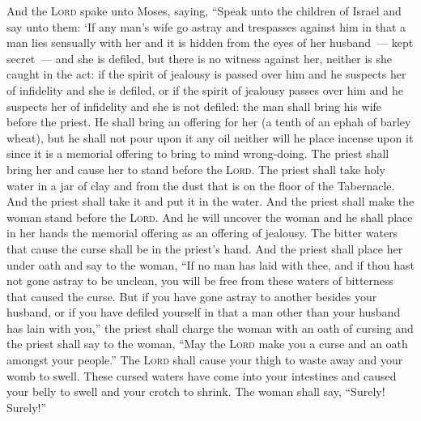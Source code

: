 \begin{inparaenum}
     And the \textsc{Lord} spake unto Moses, saying,%
     ``Speak unto the children of Israel and say unto them: `If any man's wife go astray and trespasses against him%
     in that a man lies sensually with her and it is hidden from the eyes of her husband~--- kept secret~--- and she is defiled, but there is no witness against her, neither is she caught in the act:%
     if the spirit of jealousy is passed over him and he suspects her of infidelity and she is defiled, or if the spirit of jealousy passes over him and he suspects her of infidelity and she is not defiled:%
     the man shall bring his wife before the priest. He shall bring an offering for her (a tenth of an ephah of barley wheat), but he shall not pour upon it any oil neither will he place incense upon it since it is a memorial offering to bring to mind wrong-doing.%
     The priest shall bring her and cause her to stand before the \textsc{Lord}.%
     The priest shall take holy water in a jar of clay and from the dust that is on the floor of the Tabernacle. And the priest shall take it and put it in the water.%
     And the priest shall make the woman stand before the \textsc{Lord}. And he will uncover the woman and he shall place in her hands the memorial offering as an offering of jealousy. The bitter waters that cause the curse shall be in the priest's hand.%
     And the priest shall place her under oath and say to the woman, ``If no man has laid with thee, and if thou hast not gone astray to be unclean, you will be free from these waters of bitterness that caused the curse.%
     But if you have gone astray to another besides your husband, or if you have defiled yourself in that a man other than your husband has lain with you,''%
     the priest shall charge the woman with an oath of cursing and the priest shall say to the woman, ``May the \textsc{Lord} make you a curse and an oath amongst your people.'' The \textsc{Lord} shall cause your thigh to waste away and your womb to swell.%
     These cursed waters have come into your intestines and caused your belly to swell and your crotch to shrink. The woman shall say, ``Surely! Surely!''%

\end{inparaenum}
